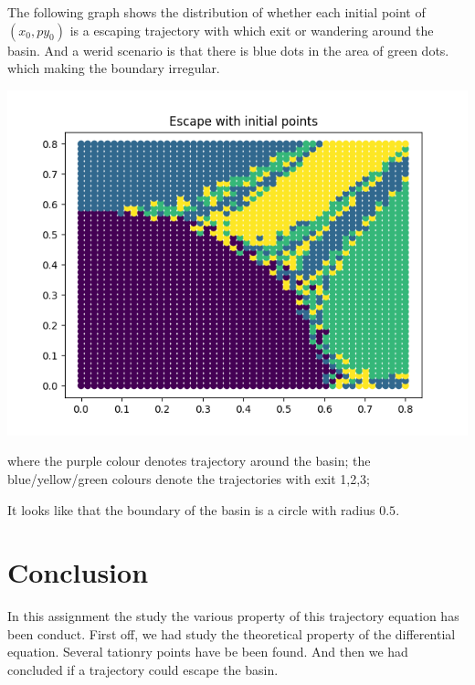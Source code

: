 \documentclass{article}
\begin{document}
	The following graph shows the distribution of whether each initial point of $(x_0, py_0)$
	is a escaping trajectory with which exit or wandering around the basin. And a werid scenario is that there is blue dots in the area of green dots.
	which making the boundary irregular. 
	
	\includegraphics[scale=0.5]{./escape_dist.png}
	

	where the purple colour denotes trajectory around the basin;
	the blue/yellow/green colours denote the trajectories with exit 1,2,3;

	It looks like that the boundary of the basin is a circle with radius $0.5$. 

\section{Conclusion}
In this assignment the study the various property of this trajectory equation has been conduct.
First off, we had study the theoretical property of the differential equation. Several tationry points have be been found.
And then we had concluded if a trajectory could escape the basin.
\end{document}
